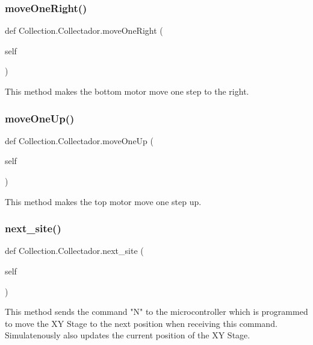 \subsubsection{\texorpdfstring{moveOneRight()}{moveOneRight()}}
{\footnotesize\ttfamily def Collection.\+Collectador.\+move\+One\+Right (\begin{DoxyParamCaption}\item[{}]{self }\end{DoxyParamCaption})}

\begin{DoxyVerb}This method makes the bottom motor move one step to the right.
\end{DoxyVerb}
 \mbox{\label{class_collection_1_1_collectador_adab834abec1ab30ea7041d4f3637a7f7}} 
\subsubsection{\texorpdfstring{moveOneUp()}{moveOneUp()}}
{\footnotesize\ttfamily def Collection.\+Collectador.\+move\+One\+Up (\begin{DoxyParamCaption}\item[{}]{self }\end{DoxyParamCaption})}

\begin{DoxyVerb}This method makes the top motor move one step up.
\end{DoxyVerb}
 \mbox{\label{class_collection_1_1_collectador_aa156ce605af4adfec1bfb7aa8447eb65}} 
\subsubsection{\texorpdfstring{next\_site()}{next\_site()}}
{\footnotesize\ttfamily def Collection.\+Collectador.\+next\+\_\+site (\begin{DoxyParamCaption}\item[{}]{self }\end{DoxyParamCaption})}

\begin{DoxyVerb}This method sends the command "N" to the microcontroller which is programmed to move the XY Stage to the next position when receiving this command.
Simulatenously also updates the current position of the XY Stage.
\end{DoxyVerb}
 \mbox{\label{class_collection_1_1_collectador_ada8c768e4da16031fe01afcef78957e1}} 
